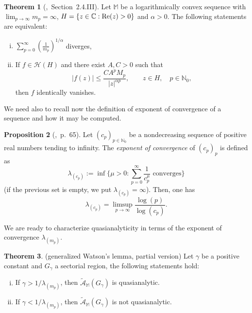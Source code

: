 \documentclass[11pt,a4paper]{article}
\theoremstyle{definition}
\newtheorem{theo}{Theorem}[section]
\newtheorem{pro}[theo]{Proposition}
\newenvironment{prop}{\smallskip\begin{pro}}{\end{pro}\smallskip}
\def\oo{\infty}
\def\ri{\rightarrow}
\def\a{\alpha}
\def\ga{\gamma}
\def\Re{\mathop{\rm Re}\nolimits}
\def\N{\mathbb{N}}
\def\C{\mathbb{C}}      %
\def\M{\mathbb{M}}
\begin{document}
\begin{theo}[\cite{mandelbrojt},\ Section\ 2.4.III]
 Let $\M$ be a logarithmically convex sequence with $\lim_{p\ri\oo} m_p=\oo$, $H=\{z\in\C: \Re(z)>0 \}$ and $\alpha>0$. The following statements are equivalent:
 \begin{enumerate}[(i)]
  \item $\displaystyle \sum_{p=0}^{\oo} \left(\frac{1}{m_p} \right)^{1/\a}$ diverges,
  \item If $f\in \mathcal{H}(H)$ and there exist $A,C>0$ such that
  $$|f(z)|\leq \frac{CA^pM_p}{|z|^{\a p}}, \qquad z\in H, \quad p\in \N_0,$$
  then $f$ identically vanishes.
 \end{enumerate}

\end{theo}

We need also to recall now
the definition of exponent of convergence of a sequence and how it may be computed.

\begin{prop}[\cite{HOLL},\ p.\ 65]
Let $(c_p)_{p\in\N_0}$ be a nondecreasing sequence of positive real numbers tending to infinity. The \textit{exponent of convergence}
of $(c_p)_p$ is defined as
$$
\lambda_{(c_p)}:=\inf\{\mu>0:\sum_{p=0}^\infty \frac{1}{c_p^{\mu}}\textrm{ converges}\}
$$
(if the previous set is empty, we put $\lambda_{(c_p)}=\infty$). Then, one has
\begin{equation}\label{equaexpoconv}
\lambda_{(c_p)}=\limsup_{p\to\infty}\frac{\log(p)}{\log(c_p)}.
\end{equation}
\end{prop}

We are ready to characterize quasianalyticity in terms of the exponent of convergence $\lambda_{(m_p)}$.


\begin{theo}(generalized Watson's lemma, partial version) \label{theo.partial.version.general.Watson.Lemma.following.Mandelbrojt}
Let $\ga$ be a positive constant and $G_\ga$ a sectorial region, the following statements hold:
\begin{enumerate}[(i)]
 \item If $\ga>1/\lambda_{(m_p)}$,  then  $\mathcal{\tilde{A}}_{\M}(G_\ga)$ is quasianalytic.
 \item If $\ga<1/\lambda_{(m_p)}$,  then  $\mathcal{\tilde{A}}_{\M}(G_\ga)$ is not quasianalytic.
\end{enumerate}
\end{theo}
\end{document}
